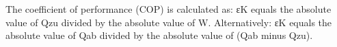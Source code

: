 The coefficient of performance (COP) is calculated as:  
εK equals the absolute value of Qzu divided by the absolute value of W.  
Alternatively:  
εK equals the absolute value of Qab divided by the absolute value of (Qab minus Qzu).